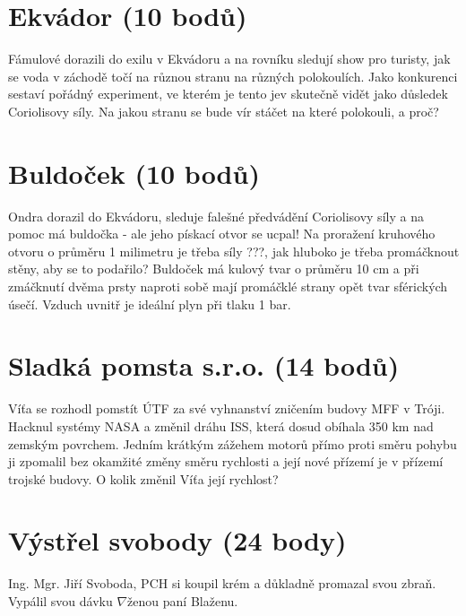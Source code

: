 \documentclass[10pt,a4paper,landscape]{article}
\begin{document}
\begin{multicols}{2}[]
\section{Ekvádor (10 bodů)}
Fámulové dorazili do exilu v Ekvádoru a na rovníku sledují show pro turisty, jak se voda v záchodě točí na různou stranu na různých polokoulích. Jako konkurenci sestaví pořádný experiment, ve kterém je tento jev skutečně vidět jako důsledek Coriolisovy síly. Na jakou stranu se bude vír stáčet na které polokouli, a proč?

\section{Buldoček (10 bodů)}
Ondra dorazil do Ekvádoru, sleduje falešné předvádění Coriolisovy síly a na pomoc má buldočka - ale jeho pískací otvor se ucpal! Na proražení kruhového otvoru o průměru 1 milimetru je třeba síly ???, jak hluboko je třeba promáčknout stěny, aby se to podařilo? Buldoček má kulový tvar o průměru 10 cm a při zmáčknutí dvěma prsty naproti sobě mají promáčklé strany opět tvar sférických úsečí. Vzduch uvnitř je ideální plyn při tlaku 1 bar.

\section{Sladká pomsta s.r.o. (14 bodů)}
Víťa se rozhodl pomstít ÚTF za své vyhnanství zničením budovy MFF v Tróji. Hacknul systémy NASA a změnil dráhu ISS, která dosud obíhala 350 km nad zemským povrchem. Jedním krátkým zážehem motorů přímo proti směru pohybu ji zpomalil bez okamžité změny směru rychlosti a její nové přízemí je v přízemí trojské budovy. O kolik změnil Víťa její rychlost?


\section{Výstřel {\huge s}vobody (24 body)}
Ing. Mgr. Jiří Svoboda, PCH si koupil krém a důkladně promazal svou zbraň. Vypálil svou dávku $\nabla$ženou paní Blaženu.


\end{multicols}
\end{document}
